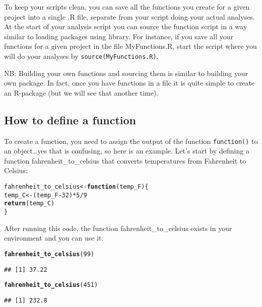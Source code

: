 \documentclass[12pt,a4paper]{scrartcl}\usepackage[]{graphicx}\usepackage[]{color}
\makeatletter
\newcommand{\hlnum}[1]{\textcolor[rgb]{0.686,0.059,0.569}{#1}}%
\newcommand{\hlopt}[1]{\textcolor[rgb]{0,0,0}{#1}}%
\newcommand{\hlstd}[1]{\textcolor[rgb]{0.345,0.345,0.345}{#1}}%
\newcommand{\hlkwa}[1]{\textcolor[rgb]{0.161,0.373,0.58}{\textbf{#1}}}%
\newcommand{\hlkwb}[1]{\textcolor[rgb]{0.69,0.353,0.396}{#1}}%
\newcommand{\hlkwc}[1]{\textcolor[rgb]{0.333,0.667,0.333}{#1}}%
\newcommand{\hlkwd}[1]{\textcolor[rgb]{0.737,0.353,0.396}{\textbf{#1}}}%
\newenvironment{kframe}{%
 \def\at@end@of@kframe{}%
 \ifinner\ifhmode%
  \def\at@end@of@kframe{\end{minipage}}%
  \begin{minipage}{\columnwidth}%
 \fi\fi%
 \def\FrameCommand##1{\hskip\@totalleftmargin \hskip-\fboxsep
 \colorbox{shadecolor}{##1}\hskip-\fboxsep
     \hskip-\linewidth \hskip-\@totalleftmargin \hskip\columnwidth}%
 \MakeFramed {\advance\hsize-\width
   \@totalleftmargin\z@ \linewidth\hsize
   \@setminipage}}%
 {\par\unskip\endMakeFramed%
 \at@end@of@kframe}
\newenvironment{knitrout}{}{} %
\makeatother
\begin{document}
To keep your scripts clean, you can save all the functions you create for a given project into a single .R file, separate from your script doing your actual analyses. At the start of your analysis script you can source the function script in a way similar to loading packages using library.
For instance, if you save all your functions for a given project in the file MyFunctions.R, start the script where you will do your analyses by \texttt{source(MyFunctions.R)}.


NB: Building your own functions and sourcing them is similar to building your own package. In fact, once you have functions in a file it is quite simple to create an R-package (but we will see that another time).

\subsection{How to define a function}
To create a function, you need to assign the output of the function \texttt{function()} to an object\dots yes that is confusing, so here is an example.
Let’s start by defining a function fahrenheit\_to\_celsius that converts temperatures from Fahrenheit to Celsius:

\begin{knitrout}
\color{fgcolor}\begin{kframe}
\begin{alltt}
\hlstd{fahrenheit_to_celsius} \hlkwb{<-} \hlkwa{function}\hlstd{(}\hlkwc{temp_F}\hlstd{) \{}
  \hlstd{temp_C} \hlkwb{<-} \hlstd{(temp_F} \hlopt{-} \hlnum{32}\hlstd{)} \hlopt{*} \hlnum{5} \hlopt{/} \hlnum{9}
  \hlkwd{return}\hlstd{(temp_C)}
\hlstd{\}}
\end{alltt}
\end{kframe}
\end{knitrout}

After running this code, the function fahrenheit\_to\_celsius exists in your environment and you can use it:
\begin{knitrout}
\color{fgcolor}\begin{kframe}
\begin{alltt}
\hlkwd{fahrenheit_to_celsius}\hlstd{(}\hlnum{99}\hlstd{)}
\end{alltt}
\begin{verbatim}
## [1] 37.22
\end{verbatim}
\begin{alltt}
\hlkwd{fahrenheit_to_celsius}\hlstd{(}\hlnum{451}\hlstd{)}
\end{alltt}
\begin{verbatim}
## [1] 232.8
\end{verbatim}
\end{kframe}
\end{knitrout}
\end{document}
